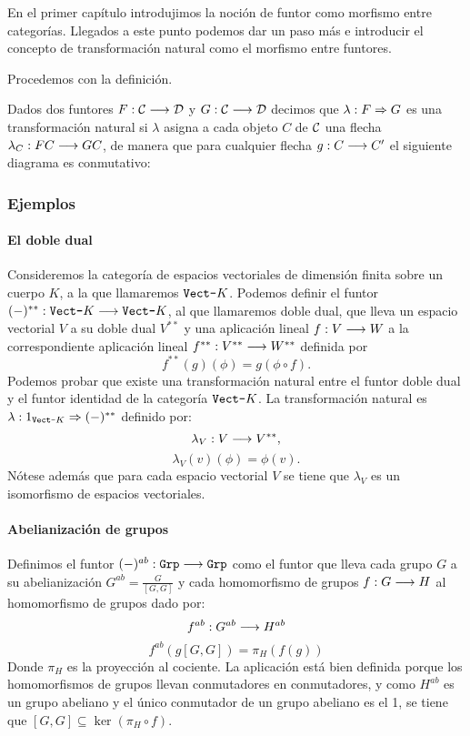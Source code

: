 En el primer capítulo introdujimos la noción de funtor
como morfismo
entre categorías. Llegados a este punto
podemos dar un paso más
e introducir el concepto de transformación
natural como el morfismo
entre funtores.

Procedemos con la definición.
\begin{definition}
  Dados dos funtores $F: \mathcal{C}\longrightarrow \mathcal{D}$ y $G : \mathcal{C}\longrightarrow \mathcal{D}$ decimos
  que $\lambda : F\Rightarrow G$ es una transformación natural si $\lambda$
  asigna a cada objeto $C$ de $\mathcal{C}$ una flecha
  $\lambda_C : FC\longrightarrow GC$, de manera que para
  cualquier flecha $g : C\longrightarrow C'$ el siguiente diagrama
  es conmutativo:
\begin{center}
  \end{center}
\end{definition}

\subsubsection{Ejemplos}
\paragraph{El doble dual}
Consideremos la categoría de espacios vectoriales de dimensión
finita sobre un cuerpo $K$, a la que llamaremos $\texttt{Vect-}K$. Podemos
definir el funtor $(-)^{**}: \texttt{Vect-}K\longrightarrow \texttt{Vect-}K$, al que llamaremos
doble dual, que lleva un espacio vectorial $V$ a su doble dual
$V^{**}$ y una aplicación lineal
$f: V\longrightarrow W$ a la correspondiente aplicación
lineal
$f^{**} : V^{**}\longrightarrow W^{**}$ definida por
$$f^{**}(g)(\phi) = g(\phi\circ f).$$
Podemos probar que existe una transformación
natural entre el funtor doble dual y el funtor identidad
de la categoría $\texttt{Vect-}K$. La transformación
natural es $\lambda : 1_{\texttt{Vect-}K}\Rightarrow (-)^{**}$ definido por:
$$\lambda_V : V\longrightarrow V^{**},$$
$$\lambda_V(v)(\phi) = \phi(v).$$
Nótese además que para cada espacio vectorial $V$ se tiene
que $\lambda_V$ es un isomorfismo de espacios vectoriales.

\paragraph{Abelianización de grupos}
Definimos el funtor $(-)^{ab} : \texttt{Grp}\longrightarrow \texttt{Grp}$
como el funtor que lleva
cada grupo $G$ a su abelianización
$G^{ab} =\frac{G}{[G, G]}$
y cada homomorfismo de grupos $f : G\longrightarrow H$ al homomorfismo
de grupos dado por:
$$f^{ab} : G^{ab}\longrightarrow H^{ab}$$
$$f^{ab}(g[G, G]) = \pi_H (f(g))$$
Donde $\pi_H$ es la proyección al cociente.
La aplicación está bien definida porque los homomorfismos
de grupos llevan conmutadores en conmutadores, y como
$H^{ab}$ es un grupo abeliano y el único conmutador de un
grupo abeliano es el 1, se tiene que
$[G, G] \subseteq \ker (\pi_H \circ f)$.

